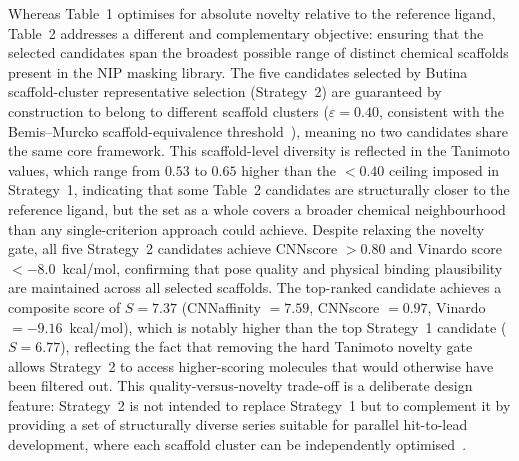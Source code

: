\documentclass[a4paper,12pt]{article}
\begin{document}
 
Whereas Table~1 optimises for absolute novelty relative to the
reference ligand, Table~2 addresses a different and
complementary objective: ensuring that the selected candidates
span the broadest possible range of distinct chemical scaffolds
present in the NIP masking library.
The five candidates selected by Butina scaffold-cluster
representative selection (Strategy~2) are guaranteed by
construction to belong to different scaffold clusters
($\varepsilon = 0.40$, consistent with the Bemis--Murcko
scaffold-equivalence threshold~\cite{bemis1996scaffolds}), meaning no two
candidates share the same core framework.
This scaffold-level diversity is reflected in the Tanimoto
values, which range from $0.53$ to $0.65$ higher than the
$< 0.40$ ceiling imposed in Strategy~1, indicating that some
Table~2 candidates are structurally closer to the reference
ligand, but the set as a whole covers a broader chemical
neighbourhood than any single-criterion approach could achieve.
Despite relaxing the novelty gate, all five Strategy~2
candidates achieve CNNscore $> 0.80$ and Vinardo score
$< -8.0$~kcal/mol, confirming that pose quality and physical
binding plausibility are maintained across all selected
scaffolds.
The top-ranked candidate achieves a composite score of
$S = 7.37$ (CNNaffinity $= 7.59$, CNNscore $= 0.97$,
Vinardo $= -9.16$~kcal/mol), which is notably higher than the
top Strategy~1 candidate ($S = 6.77$), reflecting the fact
that removing the hard Tanimoto novelty gate allows Strategy~2
to access higher-scoring molecules that would otherwise have
been filtered out.
This quality-versus-novelty trade-off is a deliberate design
feature: Strategy~2 is not intended to replace Strategy~1 but
to complement it by providing a set of structurally diverse
series suitable for parallel hit-to-lead development, where
each scaffold cluster can be independently optimised~\cite{bemis1996scaffolds}.
 
\end{document}
